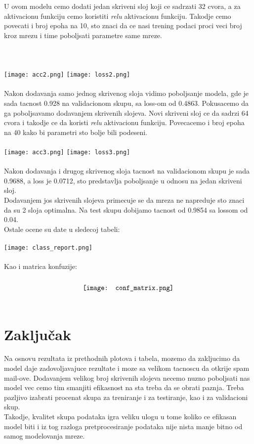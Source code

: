 \documentclass{article}
\begin{document}
U ovom modelu cemo dodati jedan skriveni sloj koji ce sadrzati 32 cvora, a za aktivacionu funkciju cemo koristiti \textit{relu} aktivacionu funkciju. Takodje cemo povecati i broj epoha na 10, sto znaci da ce nasi trening podaci proci veci broj kroz mrezu i time poboljsati parametre same mreze.\\ \\ \\ \\
\texttt{[image: acc2.png]}
\texttt{[image: loss2.png]}\\
\\
Nakon dodavanja samo jednog skrivenog sloja vidimo poboljsanje modela, gde je sada tacnost 0.928 na validacionom skupu, sa loss-om od 0.4863.
Pokusacemo da ga poboljsavamo dodavanjem skrivenih slojeva. Novi skriveni sloj ce da sadrzi 64 cvora i takodje ce da koristi \textit{relu} aktivacionu funkciju. Povecacemo i broj epoha na 40 kako bi parametri sto bolje bili podeseni.\\
\\
\texttt{[image: acc3.png]}
\texttt{[image: loss3.png]}\\
\\
Nakon dodavanja i drugog skrivenog sloja tacnost na validacionom skupu je sada 0.9688, a loss je 0.0712, sto predstavlja poboljsanje u odnosu na jedan skriveni sloj.\\
Dodavanjem jos skrivenih slojeva primecuje se da mreza ne napreduje sto znaci da su 2 sloja optimalna. Na test skupu dobijamo tacnost od 0.9854 sa lossom od 0.04.\\
Ostale ocene su date u sledecoj tabeli:\\ 
\\
\texttt{[image: class\_report.png]}\\
\\
Kao i matrica konfuzije:\\ 
\\
$$\texttt{[image: conf\_matrix.png]}\\$$
\\
\section{Zaključak}
Na osnovu rezultata iz prethodnih plotova i tabela, mozemo da zakljucimo da model daje zadovoljavajuce rezultate i moze sa velikom tacnoscu da otkrije spam mail-ove. Dodavanjem velikog broj skrivenih slojeva necemo nuzno poboljsati nas model vec cemo tim smanjiti efikasnost na sta treba da se obrati paznja. Treba pazljivo izabrati procenat skupa za treniranje i za testiranje, kao i za validacioni skup.\\ 
Takodje, kvalitet skupa podataka igra veliku ulogu u tome koliko ce efikasan model biti i iz tog razloga pretprocesiranje podataka nije nista manje bitno od samog modelovanja mreze. 


\end{document}
